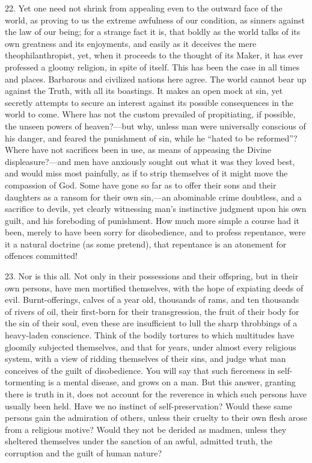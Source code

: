22. Yet one need not shrink from appealing even to the outward face
of the world, as proving to us the extreme awfulness of our condition,
as sinners against the law of our being; for a strange fact it is,
that boldly as the world talks of its own greatness and its
enjoyments, and easily as it deceives the mere theophilanthropist,
yet, when it proceeds to the thought of its Maker, it has ever
professed a gloomy religion, in spite of itself. This has been the
case in all times and places. Barbarous and civilized nations here
agree. The world cannot bear up against the Truth, with all its
boastings. It makes an open mock at sin, yet secretly attempts to
secure an interest against its possible consequences in the world to
come. Where has not the custom prevailed of propitiating, if possible,
the unseen powers of heaven?—but why, unless man were universally
conscious of his danger, and feared the punishment of sin, while he
``hated to be reformed''? Where have not sacrifices been in
use, as means of appeasing the Divine displeasure?—and men have
anxiously sought out what it was they loved best, and would miss most
painfully, as if to strip themselves of it might move the compassion
of God. Some have gone so far as to offer their sons and their
daughters as a ransom for their own sin,—an abominable crime
doubtless, and a sacrifice to devils, yet clearly witnessing man's
instinctive judgment upon his own guilt, and his foreboding of
punishment. How much more simple a course had it been, merely to have
been sorry for disobedience, and to profess repentance, were it a
natural doctrine (as some pretend), that repentance is an atonement
for offences committed!

23. Nor is this all. Not only in their possessions and their
offspring, but in their own persons, have men mortified themselves,
with the hope of expiating deeds of evil. Burnt-offerings, calves of a
year old, thousands of rams, and ten thousands of rivers of oil, their
first-born for their transgression, the fruit of their body for the
sin of their soul, even these are insufficient to lull the sharp
throbbings of a heavy-laden conscience. Think of the bodily tortures
to which multitudes have gloomily subjected themselves, and that for
years, under almost every religious system, with a view of ridding
themselves of their sins, and judge what man conceives of the guilt of
disobedience. You will say that such fierceness in self-tormenting is
a mental disease, and grows on a man. But this answer, granting there
is truth in it, does not account for the reverence in which such
persons have usually been held. Have we no instinct of
self-preservation? Would these same persons gain the admiration of
others, unless their cruelty to their own flesh arose from a religious
motive? Would they not be derided as madmen, unless they sheltered
themselves under the sanction of an awful, admitted truth, the
corruption and the guilt of human nature?

